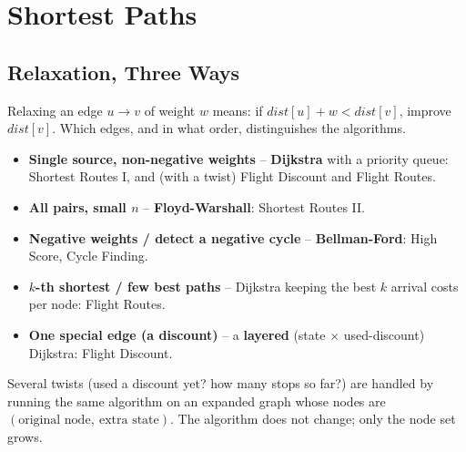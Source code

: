 \chapter{Shortest Paths}

\section{Relaxation, Three Ways}
\label{sec:cses-graph-shortest-intro}

Relaxing an edge $u\to v$ of weight $w$ means: if
$\textit{dist}[u]+w<\textit{dist}[v]$, improve $\textit{dist}[v]$. Which
edges, and in what order, distinguishes the algorithms.

\begin{patternbox}
\begin{itemize}
  \item \textbf{Single source, non-negative weights} -- \textbf{Dijkstra}
        with a priority queue: Shortest Routes I, and (with a twist)
        Flight Discount and Flight Routes.
  \item \textbf{All pairs, small $n$} -- \textbf{Floyd-Warshall}:
        Shortest Routes II.
  \item \textbf{Negative weights / detect a negative cycle} --
        \textbf{Bellman-Ford}: High Score, Cycle Finding.
  \item \textbf{$k$-th shortest / few best paths} -- Dijkstra keeping the
        best $k$ arrival costs per node: Flight Routes.
  \item \textbf{One special edge (a discount)} -- a \textbf{layered}
        (state $\times$ used-discount) Dijkstra: Flight Discount.
  \end{itemize}
\end{patternbox}

\begin{ideabox}
Several twists (used a discount yet? how many stops so far?) are handled by
running the same algorithm on an expanded graph whose nodes are
$(\text{original node},\ \text{extra state})$. The algorithm does not
change; only the node set grows.
\end{ideabox}

\newpage








